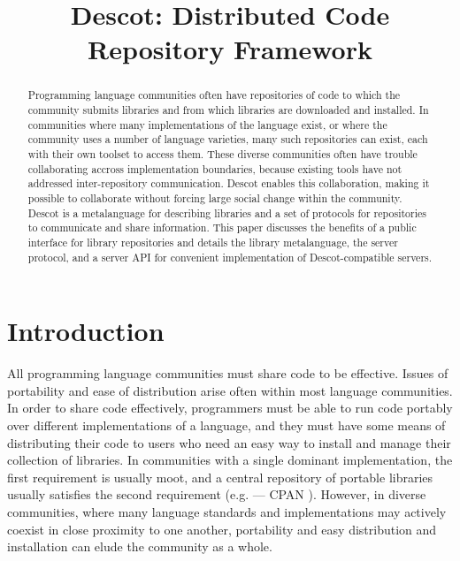 \documentclass[9pt,cm,twocolumn,preprint]{sigplanconf}
\begin{document}
\title{Descot: Distributed Code Repository Framework}

\maketitle

\begin{abstract}
Programming language communities often have repositories of code 
to which the community submits libraries and from which libraries 
are downloaded and installed.
In communities where many implementations of the language exist, 
or where the community uses a number of language varieties, 
many such repositories can exist, 
each with their own toolset to access them.
These diverse communities often have trouble collaborating accross 
implementation boundaries, because existing tools have not addressed
inter-repository communication. Descot enables this collaboration, 
making it possible to collaborate without forcing large social
change within the community.
Descot is a metalanguage for describing libraries and 
a set of protocols for repositories to communicate and share 
information. 
This paper discusses the benefits of a public interface for library 
repositories and details the library metalanguage, 
the server protocol, and a server API for convenient 
implementation of Descot-compatible servers.
\end{abstract}

\section{Introduction}

All programming language communities must share code to be effective. 
Issues of portability and ease of distribution arise often 
within most language communities. 
In order to share code effectively, programmers must be able to 
run code portably over different implementations of a language, 
and they must have some means of distributing their code to 
users who need an easy way to install and manage their collection 
of libraries. 
In communities with a single dominant implementation, 
the first requirement is usually moot, 
and a central repository of portable libraries usually 
satisfies the second requirement (e.g. --- CPAN \cite{cpan}). 
However, in diverse communities, where many language standards 
and implementations may actively coexist in close proximity to 
one another, portability and easy distribution and installation 
can elude the community as a whole. 
\end{document}
